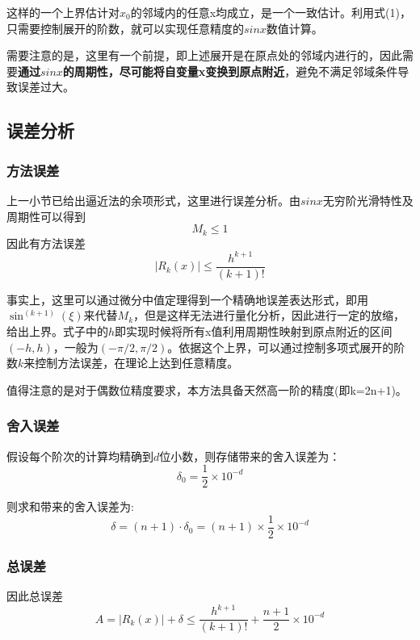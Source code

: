 \documentclass[UTF8]{ctexart}
\begin{document}
这样的一个上界估计对$x_0$的邻域内的任意x均成立，是一个一致估计。利用式(1)，只需要控制展开的阶数，就可以实现任意精度的$sinx$数值计算。

需要注意的是，这里有一个前提，即上述展开是在原点处的邻域内进行的，因此需要\textbf{通过$sinx$的周期性，尽可能将自变量x变换到原点附近}，避免不满足邻域条件导致误差过大。


\subsection{误差分析}

\subsubsection{方法误差}

上一小节已给出逼近法的余项形式，这里进行误差分析。由$sinx$无穷阶光滑特性及周期性可以得到$$M_k \leq 1$$
因此有方法误差
\begin{equation}
    |R_k(x)| \leq \frac{h^{k+1}}{(k+1)!}
\end{equation}

事实上，这里可以通过微分中值定理得到一个精确地误差表达形式，即用$\sin^{(k+1)}{(\xi)}$来代替$M_k$，但是这样无法进行量化分析，因此进行一定的放缩，给出上界。式子中的$h$即实现时候将所有x值利用周期性映射到原点附近的区间$(-h,h)$，一般为$(-\pi/2,\pi/2)$。依据这个上界，可以通过控制多项式展开的阶数$k$来控制方法误差，在理论上达到任意精度。

值得注意的是对于偶数位精度要求，本方法具备天然高一阶的精度(即k=2n+1)。

\subsubsection{舍入误差}

假设每个阶次的计算均精确到$d$位小数，则存储带来的舍入误差为：$$\delta_0 = \frac{1}{2}\times 10^{-d}$$

则求和带来的舍入误差为:
\begin{equation}
    \delta = (n+1) \cdot \delta_0 = (n+1) \times \frac{1}{2}\times 10^{-d}
\end{equation}

\subsubsection{总误差}

因此总误差
\begin{equation}
    A = |R_k(x)| + \delta \leq \frac{h^{k+1}}{(k+1)!} + \frac{n+1}{2} \times 10^{-d}
\end{equation}
\end{document}
